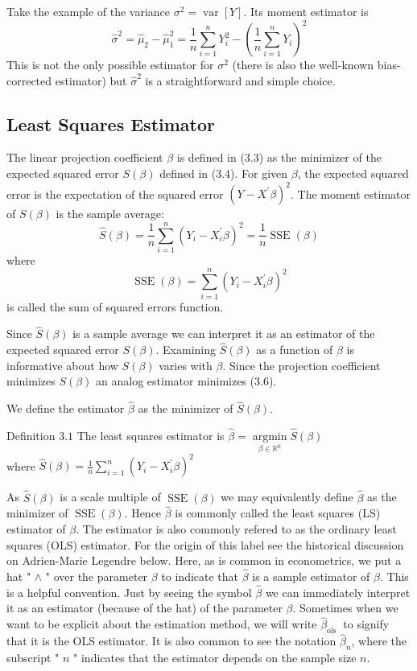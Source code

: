\documentclass[10pt]{article}
\begin{document}
Take the example of the variance $\sigma^{2}=\operatorname{var}[Y]$. Its moment estimator is
$$
\widehat{\sigma}^{2}=\widehat{\mu}_{2}-\widehat{\mu}_{1}^{2}=\frac{1}{n} \sum_{i=1}^{n} Y_{i}^{2}-\left(\frac{1}{n} \sum_{i=1}^{n} Y_{i}\right)^{2}
$$
This is not the only possible estimator for $\sigma^{2}$ (there is also the well-known bias-corrected estimator) but $\widehat{\sigma}^{2}$ is a straightforward and simple choice.

\subsection{Least Squares Estimator}
The linear projection coefficient $\beta$ is defined in (3.3) as the minimizer of the expected squared error $S(\beta)$ defined in (3.4). For given $\beta$, the expected squared error is the expectation of the squared error $\left(Y-X^{\prime} \beta\right)^{2}$. The moment estimator of $S(\beta)$ is the sample average:
$$
\widehat{S}(\beta)=\frac{1}{n} \sum_{i=1}^{n}\left(Y_{i}-X_{i}^{\prime} \beta\right)^{2}=\frac{1}{n} \operatorname{SSE}(\beta)
$$
where
$$
\operatorname{SSE}(\beta)=\sum_{i=1}^{n}\left(Y_{i}-X_{i}^{\prime} \beta\right)^{2}
$$
is called the sum of squared errors function.

Since $\widehat{S}(\beta)$ is a sample average we can interpret it as an estimator of the expected squared error $S(\beta)$. Examining $\widehat{S}(\beta)$ as a function of $\beta$ is informative about how $S(\beta)$ varies with $\beta$. Since the projection coefficient minimizes $S(\beta)$ an analog estimator minimizes (3.6).

We define the estimator $\widehat{\beta}$ as the minimizer of $\widehat{S}(\beta)$.

Definition $3.1$ The least squares estimator is $\widehat{\beta}=\underset{\beta \in \mathbb{R}^{k}}{\operatorname{argmin}} \widehat{S}(\beta)$\\
where $\widehat{S}(\beta)=\frac{1}{n} \sum_{i=1}^{n}\left(Y_{i}-X_{i}^{\prime} \beta\right)^{2}$

As $\widehat{S}(\beta)$ is a scale multiple of $\operatorname{SSE}(\beta)$ we may equivalently define $\widehat{\beta}$ as the minimizer of $\operatorname{SSE}(\beta)$. Hence $\widehat{\beta}$ is commonly called the least squares (LS) estimator of $\beta$. The estimator is also commonly refered to as the ordinary least squares (OLS) estimator. For the origin of this label see the historical discussion on Adrien-Marie Legendre below. Here, as is common in econometrics, we put a hat " $\wedge$ " over the parameter $\beta$ to indicate that $\widehat{\beta}$ is a sample estimator of $\beta$. This is a helpful convention. Just by seeing the symbol $\widehat{\beta}$ we can immediately interpret it as an estimator (because of the hat) of the parameter $\beta$. Sometimes when we want to be explicit about the estimation method, we will write $\widehat{\beta}_{\text {ols }}$ to signify that it is the OLS estimator. It is also common to see the notation $\widehat{\beta}_{n}$, where the subscript " $n$ " indicates that the estimator depends on the sample size $n$.
\end{document}
